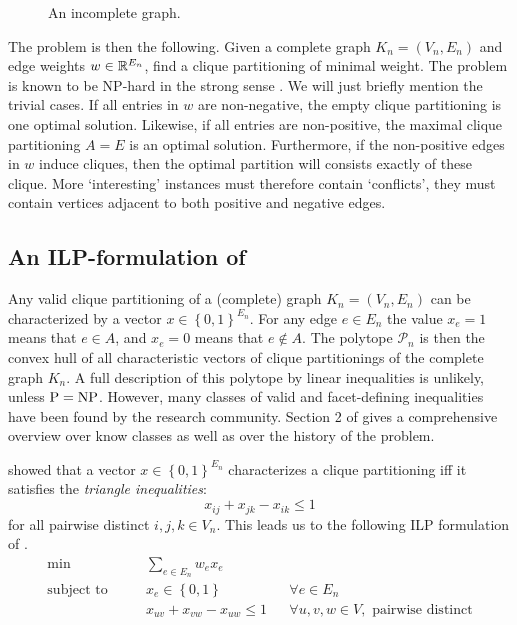 \begin{figure}[h]
	\centering
	\caption{An incomplete graph.}
	\label{fig:incomplete_graph}
\end{figure}

The \CP problem is then the following.
Given a complete graph $K_n=(V_n,E_n)$ and edge weights $w \in \mathbb{R}^{E_n}$, find a clique partitioning of minimal weight.
The problem is known to be \textsc{NP}-hard in the strong sense \cite{wakabayashiAggregationBinaryRelations1986}.
We will just briefly mention the trivial cases.
If all entries in $w$ are non-negative, the empty clique partitioning is one optimal solution.
Likewise, if all entries are non-positive, the maximal clique partitioning $A = E$ is an optimal solution.
Furthermore, if the non-positive edges in $w$ induce cliques, then the optimal partition will consists exactly of these clique.
More ‘interesting’ instances must therefore contain ‘conflicts’, \ie they must contain vertices adjacent to both positive and negative edges.

\subsection{An ILP-formulation of \CP}\label{subsec:ilp_formulation}
Any valid clique partitioning of a (complete) graph $K_{n}=(V_{n}, E_{n})$ can be characterized by a vector $x \in \left\{ 0,1 \right\}^{E_{n}}$.
For any edge $e \in E_{n}$ the value $x_{e} = 1$ means that $e \in A$, and $x_{e} = 0$ means that $e \notin A$.
The \CP polytope $\mathscr{P}_{n}$ is then the convex hull of all characteristic vectors of clique partitionings of the complete graph $K_{n}$.
A full description of this polytope by linear inequalities is unlikely, unless $\mathit{\text{P}} = \mathit{\text{NP}}$.
However, many classes of valid and facet-defining inequalities have been found by the research community.
Section 2 of \cite{andresPolyhedralStudyLifted2022} gives a comprehensive overview over know classes as well as over the history of the problem.

\cite{grotschelFacetsCliquePartitioning1990} showed that a vector $x \in \left\{ 0,1 \right\}^{E_{n}}$ characterizes a clique partitioning iff it satisfies the \textit{triangle inequalities}:
\[
	 x_{ij} + x_{jk} - x_{ik} \leq 1
\]
for all pairwise distinct $i,j,k \in V_{n}$.
This leads us to the following ILP formulation of \CP.
\begin{align*}
	\min && &\sum_{e \in E_{n}} w_{e} x_{e} \\[1.5ex]
	\text{subject to } && &x_{e} \in \left\{ 0,1 \right\} && \forall e \in E_{n} \\
					   && &x_{uv} + x_{vw} - x_{uw} \leq 1 && \forall u,v,w \in V, \text{ pairwise distinct} \\
\end{align*}

